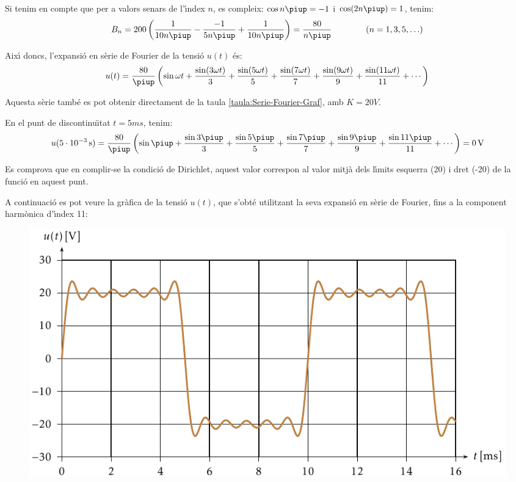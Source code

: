 \begin{exemple}
Si tenim en compte que per a valors senars de l'\'{\i}ndex $n$, es
compleix: $\cos n \piup = -1$ i $\cos (2 n \piup) = 1$, tenim:
\[
    B_n = 200 \left( \frac{1}{10 n \piup} - \frac{-1}{5 n \piup} +
    \frac{1}{10 n \piup} \right) = \frac{80}{n \piup}
    \qquad\qquad(n=1,3,5,\ldots)
\]

Aix\'{\i} doncs, l'expansi\'{o} en s\`{e}rie de Fourier de la tensi\'{o} $u(t)$ \'{e}s:
\[
    u(t) = \frac{80}{\piup} \left( \sin \omega t + \frac{\sin (3 \omega t)}{3} +
    \frac{\sin (5 \omega t)}{5} + \frac{\sin (7 \omega t)}{7} +
    \frac{\sin (9 \omega t)}{9} + \frac{\sin (11 \omega t)}{11} +\cdots\right)
\]

Aquesta s\`{e}rie tamb\'{e} es pot obtenir directament de la taula \vref{taula:Serie-Fourier-Graf}, amb $K=20\unit{V}$.

En el punt de discontinu\"{\i}tat $t=5\unit{ms}$, tenim:
\[
    u(5\cdot10^{-3}\unit{s}) =\frac{80}{\piup} \left( \sin \piup + \frac{\sin 3 \piup}{3} +
    \frac{\sin 5 \piup}{5} + \frac{\sin 7 \piup}{7} +
    \frac{\sin 9 \piup}{9} +\frac{\sin 11 \piup}{11}+\cdots\right) = 0\unit{V}
\]

Es comprova que en complir-se la condici\'{o} de Dirichlet, aquest valor
correspon al valor mitj\`{a} dels l\'{\i}mits esquerra (20) i dret (-20)  de
la funci\'{o} en aquest punt.

A continuaci\'{o} es pot veure la gr\`{a}fica de la tensi\'{o} $u(t)$, que
s'obt\'{e} utilitzant la seva expansi\'{o} en s\`{e}rie de Fourier, fins a la
component harm\`{o}nica d'\'{\i}ndex 11:
\vspace{5mm}
\begin{figure}[h!b]
\centering
    \includegraphics{Imatges/Cap-Fourier-Exemple-Tensio.pdf}
\end{figure}


\end{exemple}
